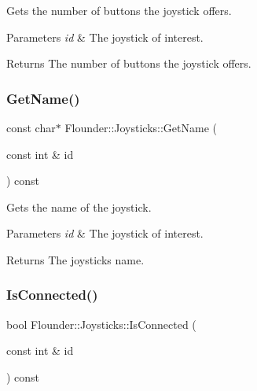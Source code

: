 Gets the number of buttons the joystick offers. 


\begin{DoxyParams}{Parameters}
{\em id} & The joystick of interest. \\
\hline
\end{DoxyParams}
\begin{DoxyReturn}{Returns}
The number of buttons the joystick offers. 
\end{DoxyReturn}
\mbox{\label{class_flounder_1_1_joysticks_a06c2c2521ce46921a679c78b9d170072}} 
\subsubsection{\texorpdfstring{Get\+Name()}{GetName()}}
{\footnotesize\ttfamily const char$\ast$ Flounder\+::\+Joysticks\+::\+Get\+Name (\begin{DoxyParamCaption}\item[{const int \&}]{id }\end{DoxyParamCaption}) const\hspace{0.3cm}{\ttfamily [inline]}}



Gets the name of the joystick. 


\begin{DoxyParams}{Parameters}
{\em id} & The joystick of interest. \\
\hline
\end{DoxyParams}
\begin{DoxyReturn}{Returns}
The joysticks name. 
\end{DoxyReturn}
\mbox{\label{class_flounder_1_1_joysticks_abd63db24c4dcdc3440cf35a52b866d8e}} 
\subsubsection{\texorpdfstring{Is\+Connected()}{IsConnected()}}
{\footnotesize\ttfamily bool Flounder\+::\+Joysticks\+::\+Is\+Connected (\begin{DoxyParamCaption}\item[{const int \&}]{id }\end{DoxyParamCaption}) const\hspace{0.3cm}{\ttfamily [inline]}}



